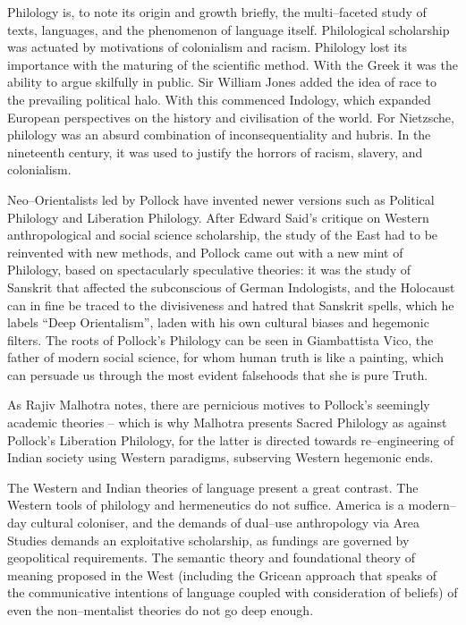 Philology is, to note its origin and growth briefly, the multi–faceted study of texts, languages, and the phenomenon of language itself. Philological scholarship was actuated by motivations of colonialism and racism. Philology lost its importance with the maturing of the scientific method. With the Greek it was the ability to argue skilfully in public. Sir William Jones added the idea of race to the prevailing political halo. With this commenced Indology, which expanded European perspectives on the history and civilisation of the world. For Nietzsche, philology was an absurd combination of inconsequentiality and hubris. In the nineteenth century, it was used to justify the horrors of racism, slavery, and colonialism. 

Neo–Orientalists led by Pollock have invented newer versions such as Political Philology and Liberation Philology. After Edward Said’s critique on Western anthropological and social science scholarship, the study of the East had to be reinvented with new methods, and Pollock came out with a new mint of Philology, based on spectacularly speculative theories: it was the study of Sanskrit that affected the subconscious of German Indologists, and the Holocaust can in fine be traced to the divisiveness and hatred that Sanskrit spells, which he labels “Deep Orientalism”, laden with his own cultural biases and hegemonic filters. The roots of Pollock’s Philology can be seen in Giambattista Vico, the father of modern social science, for whom human truth is like a painting, which can persuade us through the most evident falsehoods that she is pure Truth. 

As Rajiv Malhotra notes, there are pernicious motives to Pollock’s seemingly academic theories – which is why Malhotra presents Sacred Philology as against Pollock’s Liberation Philology, for the latter is directed towards re–engineering of Indian society using Western paradigms, subserving Western hegemonic ends.

The Western and Indian theories of language present a great contrast. The Western tools of philology and hermeneutics do not suffice. America is a modern–day cultural coloniser, and the demands of dual–use anthropology via Area Studies demands an exploitative scholarship, as fundings are governed by geopolitical requirements. The semantic theory and foundational theory of meaning proposed in the West (including the Gricean approach that speaks of the communicative intentions of language coupled with consideration of beliefs) of even the non–mentalist theories do not go deep enough.

